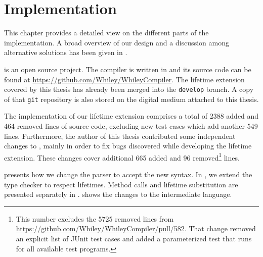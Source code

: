 \chapter{Implementation}\label{chapter:implementation}

This chapter provides a detailed view on the different parts of the implementation.
A broad overview of our design and a discussion among alternative solutions has been given in .

\whiley is an open source project.
The compiler is written in \java and its source code can be found at \url{https://github.com/Whiley/WhileyCompiler}.
The lifetime extension covered by this thesis has already been merged into the \texttt{develop} branch.
A copy of that \texttt{git} repository is also stored on the digital medium attached to this thesis.

The implementation of our lifetime extension comprises a total of 2388 added and 464 removed lines of \java source code, excluding new test cases which add another 549 lines.
Furthermore, the author of this thesis contributed some independent changes to \whiley, mainly in order to fix bugs discovered while developing the lifetime extension.
These changes cover additional 665 added and 96 removed\footnote{This number excludes the 5725 removed lines from \url{https://github.com/Whiley/WhileyCompiler/pull/582}. That change removed an explicit list of JUnit test cases and added a parameterized test that runs for all available test programs.} lines.

 presents how we change the parser to accept the new syntax.
In , we extend the type checker to respect lifetimes.
Method calls and lifetime substitution are presented separately in .
 shows the changes to the intermediate language.
